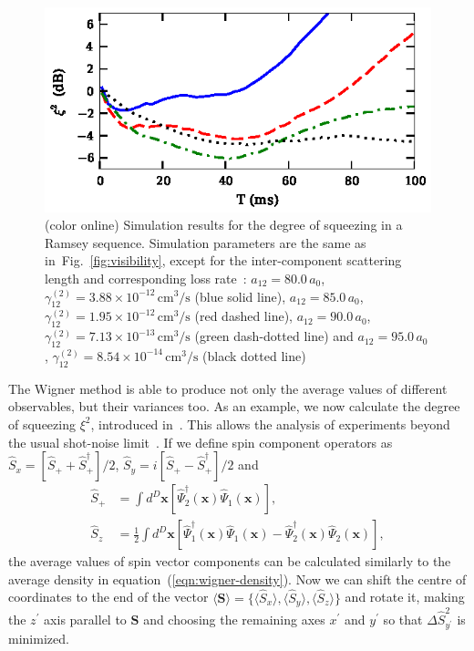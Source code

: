 \documentclass[aps,prl,twocolumn,showpacs,amsmath,amssymb,superscriptaddress,flushbottom,noraggedfooter]{revtex4-1}
\newcommand{\figref}[1]{Fig.~\ref{#1}}
\newcommand{\xvec}{\boldsymbol{x}}
\begin{document}
\begin{figure}
	\includegraphics{ramsey_squeezing.eps}

	\caption[]{(color online) Simulation results for the degree of squeezing in a Ramsey sequence.
	Simulation parameters are the same as in~\figref{fig:visibility},
	except for the inter-component scattering length and corresponding loss rate~\cite{Kaufman2009}:
	$a_{12} = 80.0\,a_0$, $\gamma^{(2)}_{12} = 3.88 \times 10^{-12}\,\mathrm{cm^3/s}$ (blue solid line),
	$a_{12} = 85.0\,a_0$, $\gamma^{(2)}_{12} = 1.95 \times 10^{-12}\,\mathrm{cm^3/s}$ (red dashed line),
	$a_{12} = 90.0\,a_0$, $\gamma^{(2)}_{12} = 7.13 \times 10^{-13}\,\mathrm{cm^3/s}$ (green dash-dotted line) and
	$a_{12} = 95.0\,a_0$, $\gamma^{(2)}_{12} = 8.54 \times 10^{-14}\,\mathrm{cm^3/s}$ (black dotted line)}

	\label{fig:squeezing}
\end{figure}

The Wigner method is able to produce not only the average values of different observables,
but their variances too.
As an example, we now calculate the degree of squeezing $\xi^2$, introduced in~\cite{Wineland1994,Sorensen2001}.
This allows the analysis of experiments beyond the usual shot-noise limit~\cite{Riedel2010,Gross2010}.
If we define spin component operators as
$\hat{S}_{x} = [ \hat{S}_+ + \hat{S}_+^\dagger ] / 2 $,
$\hat{S}_{y} = i [ \hat{S}_+ - \hat{S}_+^\dagger ] / 2 $ and
\begin{equation}
\begin{split}
	\hat{S}_+ & = \int d^D\xvec \left[
		\widehat{\Psi}^\dagger_2 (\xvec) \widehat{\Psi}_1 (\xvec)
	\right], \\
	\hat{S}_z & = \frac{1}{2} \int d^D\xvec \left[
		\widehat{\Psi}^\dagger_1 (\xvec) \widehat{\Psi}_1 (\xvec)
		- \widehat{\Psi}^\dagger_2 (\xvec) \widehat{\Psi}_2 (\xvec)
	\right],
\end{split}
\end{equation}
the average values of spin vector components can be calculated similarly to the average density in
equation~(\ref{eqn:wigner-density}).
Now we can shift the centre of coordinates to the end of the vector
$\langle \boldsymbol{S} \rangle = \{ \langle \hat{S}_x \rangle, \langle \hat{S}_y \rangle, \langle \hat{S}_z \rangle \}$
and rotate it, making the $z^\prime$ axis parallel to $\boldsymbol{S}$ and choosing the remaining axes $x^\prime$ and $y^\prime$ so that
$\Delta \hat{S}^2_{y^\prime} $ is minimized.
\end{document}
